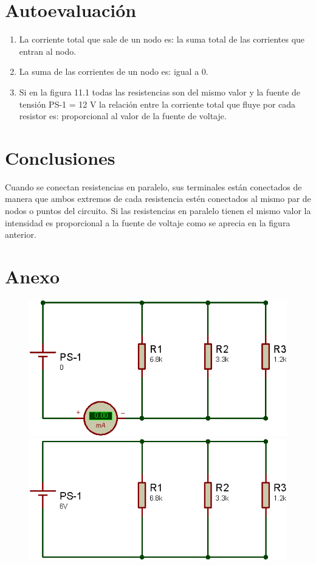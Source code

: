 \section{Autoevaluación}
\begin{enumerate}
	\item	La corriente total que sale de un nodo es: la suma total de las corrientes que entran al nodo.
	\item	La suma de las corrientes de un nodo es: igual a 0.
	\item 	Si en la figura 11.1 todas las resistencias son del mismo valor y la fuente de tensión PS-1 = 12 V la relación entre la corriente total que fluye por cada resistor es: proporcional al valor de la fuente de voltaje.
\end{enumerate}
\section{Conclusiones}
Cuando se conectan resistencias en paralelo, sus terminales están conectados de manera que ambos extremos de cada resistencia estén conectados al mismo par de nodos o puntos del circuito. 
Si las resistencias en paralelo tienen el mismo valor la intensidad es proporcional a la fuente de voltaje como se aprecia en la figura anterior.
\section{Anexo}
\begin{figure}[h]
	\centering
	\begin{minipage}{0.5\textwidth}
		\centering
		\includegraphics[width=0.8\linewidth]{imagenes/3}
	\end{minipage}%
	\begin{minipage}{0.5\textwidth}
		\centering
		\includegraphics[width=0.8\linewidth]{imagenes/4}
	\end{minipage}
\end{figure}

